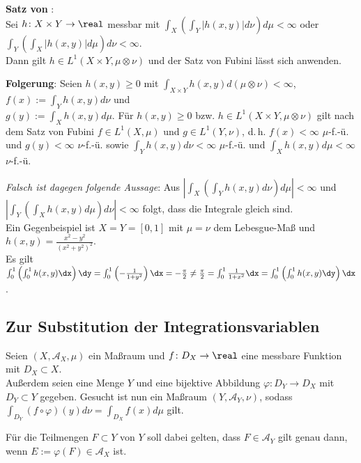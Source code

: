 \textbf{Satz von }: \\
Sei $h\colon X \times Y \rightarrow \real$ messbar mit
$\int_X (\int_Y |h(x, y)|d\nu) d\mu < \infty$ oder
$\int_Y (\int_X |h(x, y)|d\mu) d\nu < \infty$. \\
Dann gilt $h \in L^1(X \times Y, \mu \otimes \nu)$
und der Satz von Fubini lässt sich anwenden.

\linie
\pagebreak

\textbf{Folgerung}:
Seien $h(x, y) \ge 0$ mit $\int_{X \times Y} h(x, y)
d(\mu \otimes \nu) < \infty$, $f(x) := \int_Y h(x, y) d\nu$ und \\
$g(y) := \int_X h(x, y) d\mu$.
Für $h(x, y) \ge 0$ bzw. $h \in L^1(X \times Y, \mu \otimes \nu)$
gilt nach dem Satz von Fubini $f \in L^1(X, \mu)$ und $g \in L^1(Y, \nu)$,
d.\,h. $f(x) < \infty$ $\mu$-f.-ü. und $g(y) < \infty$ $\nu$-f.-ü. sowie
$\int_Y h(x, y) d\nu < \infty$ $\mu$-f.-ü. und
$\int_X h(x, y) d\mu < \infty$ $\nu$-f.-ü.

\linie

\emph{Falsch ist dagegen folgende Aussage}:
Aus $|\int_X (\int_Y h(x, y) d\nu) d\mu| < \infty$ und \\
$|\int_Y (\int_X h(x, y) d\mu) d\nu| < \infty$ folgt, dass die
Integrale gleich sind. \\
Ein Gegenbeispiel ist $X = Y = [0, 1]$ mit $\mu = \nu$ dem Lebesgue-Maß
und $h(x, y) = \frac{x^2 - y^2}{(x^2 + y^2)^2}$. \\
Es gilt $\int_0^1 \left(\int_0^1 h(x, y) \dx\right) \dy =
\int_0^1 \left(-\frac{1}{1 + y^2}\right) \dx =
-\frac{\pi}{2} \not= \frac{\pi}{2} =
\int_0^1 \frac{1}{1 + x^2} \dx = \int_0^1 \left(\int_0^1 h(x, y) \dy\right) \dx$.

\subsection{%
    Zur Substitution der Integrationsvariablen%
}

Seien $(X, \mathcal{A}_X, \mu)$ ein Maßraum und $f\colon D_X \rightarrow \real$
eine messbare Funktion mit $D_X \subset X$. \\
Außerdem seien eine Menge $Y$ und eine bijektive Abbildung
$\varphi\colon D_Y \rightarrow D_X$ mit $D_Y \subset Y$ gegeben.
Gesucht ist nun ein Maßraum $(Y, \mathcal{A}_Y, \nu)$, sodass
$\int_{D_Y} (f \circ \varphi)(y) d\nu = \int_{D_X} f(x) d\mu$ gilt.

Für die Teilmengen $F \subset Y$ von $Y$ soll dabei gelten, dass
$F \in \mathcal{A}_Y$ gilt
genau dann, wenn $E := \varphi(F) \in \mathcal{A}_X$ ist.

